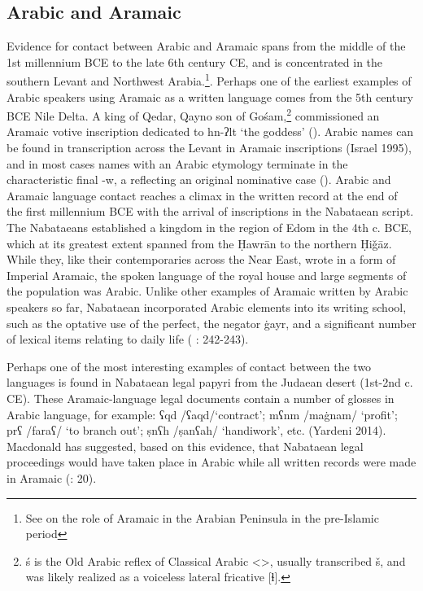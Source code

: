 \documentclass[output=paper]{langsci/langscibook}
\begin{document}
\subsection{Arabic and Aramaic}
Evidence for contact between Arabic and Aramaic spans from the middle of the 1st millennium BCE to the late 6th century CE, and is concentrated in the southern Levant and Northwest Arabia.\footnote{See \citep{stein2018} on the role of Aramaic in the Arabian Peninsula in the pre-Islamic period}. Perhaps one of the earliest examples of Arabic speakers using Aramaic as a written language comes from the 5th century BCE Nile Delta. A king of Qedar, Qayno son of Gośam,\footnote{ś is the Old Arabic reflex of Classical Arabic <{}>, usually transcribed š, and was likely realized as a voiceless lateral fricative [ɬ].} commissioned an Aramaic votive inscription dedicated to hn-ʔlt ‘the goddess’ (\citet{Rabinowitz1956}). Arabic names can be found in transcription across the Levant in Aramaic inscriptions (Israel 1995), and in most cases names with an Arabic etymology terminate in the characteristic final -w, a reflecting an original nominative case (\citet{Al-Jalladforthcoming}). Arabic and Aramaic language contact reaches a climax in the written record at the end of the first millennium BCE with the arrival of inscriptions in the Nabataean script. The Nabataeans established a kingdom in the region of Edom in the 4th c. BCE, which at its greatest extent spanned from the Ḥawrān to the northern Ḥiǧāz. While they, like their contemporaries across the Near East, wrote in a form of Imperial Aramaic, the spoken language of the royal house and large segments of the population was Arabic. Unlike other examples of Aramaic written by Arabic speakers so far, Nabataean incorporated Arabic elements into its writing school, such as the optative use of the perfect, the negator ġayr, and a significant number of lexical items relating to daily life (\citet{Gzella2015} : 242-243).

Perhaps one of the most interesting examples of contact between the two languages is found in Nabataean legal papyri from the Judaean desert (1st-2nd c. CE). These Aramaic-language legal documents contain a number of glosses in Arabic language, for example: ʕqd /ʕaqd/‘contract’; mʕnm /maġnam/ ‘profit’; prʕ /faraʕ/ ‘to branch out’; ṣnʕh /ṣanʕah/ ‘handiwork’, etc. (Yardeni 2014). Macdonald has suggested, based on this evidence, that Nabataean legal proceedings would have taken place in Arabic while all written records were made in Aramaic (\citet{Macdonald2010}: 20).
\end{document}
